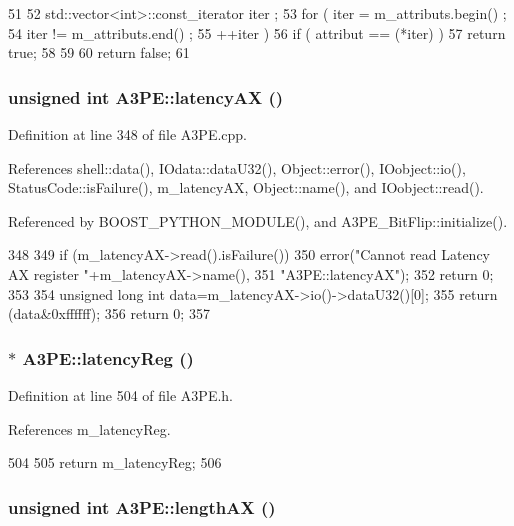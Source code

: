 \begin{DoxyCode}
51   {
52     std::vector<int>::const_iterator iter ;
53     for ( iter  = m_attributs.begin() ;
54           iter != m_attributs.end()   ;
55           ++iter ) {
56       if ( attribut == (*iter) ) {
57         return true;
58       }
59     }
60     return false;
61   }
\end{DoxyCode}
\hypertarget{classA3PE_ab5970721a8172ae57b3da68040f58199}{
\subsubsection[{latencyAX}]{\setlength{\rightskip}{0pt plus 5cm}unsigned int A3PE::latencyAX ()}}
\label{classA3PE_ab5970721a8172ae57b3da68040f58199}


Definition at line 348 of file A3PE.cpp.

References shell::data(), IOdata::dataU32(), Object::error(), IOobject::io(), StatusCode::isFailure(), m\_\-latencyAX, Object::name(), and IOobject::read().

Referenced by BOOST\_\-PYTHON\_\-MODULE(), and A3PE\_\-BitFlip::initialize().


\begin{DoxyCode}
348                             {
349   if (m_latencyAX->read().isFailure()){
350     error("Cannot read Latency AX register "+m_latencyAX->name(),
351         "A3PE::latencyAX");
352     return 0;
353   }
354   unsigned long int data=m_latencyAX->io()->dataU32()[0];
355   return (data&0xffffff);
356   return 0;
357 }
\end{DoxyCode}
\hypertarget{classA3PE_a42dad20d5a1482431e73c64250b76185}{
\subsubsection[{latencyReg}]{$\ast$ A3PE::latencyReg ()}}
\label{classA3PE_a42dad20d5a1482431e73c64250b76185}


Definition at line 504 of file A3PE.h.

References m\_\-latencyReg.


\begin{DoxyCode}
504                         {
505     return m_latencyReg;
506   }
\end{DoxyCode}
\hypertarget{classA3PE_acb95104d817db2e4f97e250f7e45b43d}{
\subsubsection[{lengthAX}]{\setlength{\rightskip}{0pt plus 5cm}unsigned int A3PE::lengthAX ()}}
\label{classA3PE_acb95104d817db2e4f97e250f7e45b43d}


